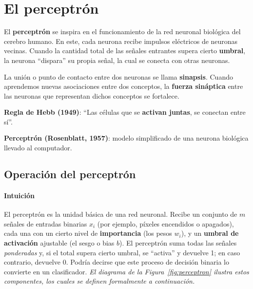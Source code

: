 \section{El perceptrón}

El \textbf{perceptrón} se inspira en el funcionamiento de la red neuronal biológica del cerebro humano. En este, cada neurona recibe impulsos eléctricos de neuronas vecinas. Cuando la cantidad total de las señales entrantes supera cierto \textbf{umbral}, la neurona ``dispara'' su propia señal, la cual se conecta con otras neuronas.

La unión o punto de contacto entre dos neuronas se llama \textbf{sinapsis}. Cuando aprendemos nuevas asociaciones entre dos conceptos, la \textbf{fuerza sináptica} entre las neuronas que representan dichos conceptos se fortalece.

\textbf{Regla de Hebb (1949)}: ``Las células que se \textbf{activan juntas}, se conectan entre sí''.

\begin{definicion}
\textbf{Perceptrón (Rosenblatt, 1957)}: modelo simplificado de una neurona biológica llevado
al computador.
\end{definicion}

\subsection{Operación del perceptrón}

\paragraph{Intuición}
El perceptrón es la unidad básica de una red neuronal. Recibe un conjunto de $m$ señales de entradas binarias $x_i$ (por ejemplo, píxeles encendidos o apagados), cada una con un cierto nivel de \textbf{importancia} (los pesos $w_i$), y un \textbf{umbral de activación} ajustable (el sesgo o bias $b$). 
El perceptrón suma todas las señales \emph{ponderadas} y, si el total supera cierto umbral, se ``activa'' y devuelve 1; en caso contrario, devuelve 0. 
Podría decirse que este proceso de decisión binaria lo convierte en un clasificador.
\emph{El diagrama de la Figura~\ref{fig:perceptron} ilustra estos componentes, los cuales se definen formalmente a continuación.}

